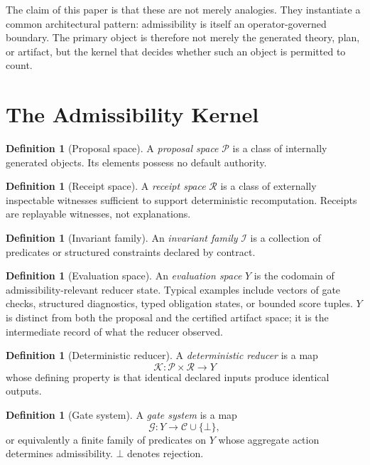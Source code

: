 \documentclass[12pt]{amsart}
\numberwithin{equation}{section}
\theoremstyle{definition}
\newtheorem{definition}[theorem]{Definition}
\theoremstyle{remark}
\newcommand{\PP}{\mathcal P}
\newcommand{\RRc}{\mathcal R}
\newcommand{\II}{\mathcal I}
\newcommand{\KK}{\mathcal K}
\newcommand{\GG}{\mathcal G}
\newcommand{\CC}{\mathcal C}
\newcommand{\YY}{Y}
\begin{document}
The claim of this paper is that these are not merely analogies.  They instantiate a common
architectural pattern: admissibility is itself an operator-governed boundary.  The primary object
is therefore not merely the generated theory, plan, or artifact, but the kernel that decides
whether such an object is permitted to count.

\section{The Admissibility Kernel}

\begin{definition}[Proposal space]
A \emph{proposal space} $\PP$ is a class of internally generated objects.  Its elements possess
no default authority.
\end{definition}

\begin{definition}[Receipt space]
A \emph{receipt space} $\RRc$ is a class of externally inspectable witnesses sufficient to support
deterministic recomputation.  Receipts are replayable witnesses, not explanations.
\end{definition}

\begin{definition}[Invariant family]
An \emph{invariant family} $\II$ is a collection of predicates or structured constraints declared
by contract.
\end{definition}

\begin{definition}[Evaluation space]
An \emph{evaluation space} $\YY$ is the codomain of admissibility-relevant reducer state.
Typical examples include vectors of gate checks, structured diagnostics, typed obligation states,
or bounded score tuples.  $\YY$ is distinct from both the proposal and the certified artifact
space; it is the intermediate record of what the reducer observed.
\end{definition}

\begin{definition}[Deterministic reducer]
A \emph{deterministic reducer} is a map
\[
  \KK:\PP\times\RRc\to\YY
\]
whose defining property is that identical declared inputs produce identical outputs.
\end{definition}

\begin{definition}[Gate system]
A \emph{gate system} is a map
\[
  \GG:\YY\to\CC\cup\{\bot\},
\]
or equivalently a finite family of predicates on $\YY$ whose aggregate action determines
admissibility.  $\bot$ denotes rejection.
\end{definition}
\end{document}
